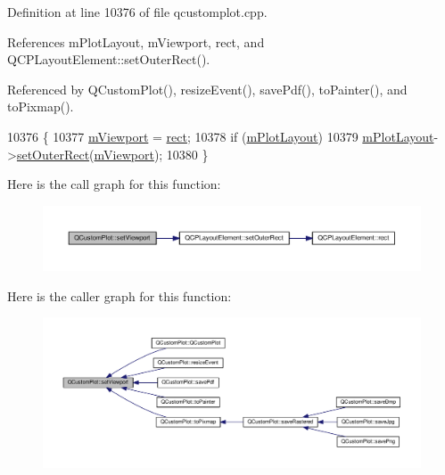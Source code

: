Definition at line 10376 of file qcustomplot.\+cpp.



References m\+Plot\+Layout, m\+Viewport, rect, and Q\+C\+P\+Layout\+Element\+::set\+Outer\+Rect().



Referenced by Q\+Custom\+Plot(), resize\+Event(), save\+Pdf(), to\+Painter(), and to\+Pixmap().


\begin{DoxyCode}
10376                                                \{
10377   \hyperlink{class_q_custom_plot_ac0a7c38a715526c257cff95774f83ab6}{mViewport} = \hyperlink{_gen_blob_8m_aea8f6815d9a63491fc422c5572c6b3c3}{rect};
10378   \textcolor{keywordflow}{if} (\hyperlink{class_q_custom_plot_ac97298756882a0eecd98151679850ac1}{mPlotLayout})
10379     \hyperlink{class_q_custom_plot_ac97298756882a0eecd98151679850ac1}{mPlotLayout}->\hyperlink{class_q_c_p_layout_element_a38975ea13e36de8e53391ce41d94bc0f}{setOuterRect}(\hyperlink{class_q_custom_plot_ac0a7c38a715526c257cff95774f83ab6}{mViewport});
10380 \}
\end{DoxyCode}


Here is the call graph for this function\+:\nopagebreak
\begin{figure}[H]
\begin{center}
\leavevmode
\includegraphics[width=350pt]{class_q_custom_plot_a3f9bc4b939dd8aaba9339fd09f273fc4_cgraph}
\end{center}
\end{figure}




Here is the caller graph for this function\+:\nopagebreak
\begin{figure}[H]
\begin{center}
\leavevmode
\includegraphics[width=350pt]{class_q_custom_plot_a3f9bc4b939dd8aaba9339fd09f273fc4_icgraph}
\end{center}
\end{figure}


